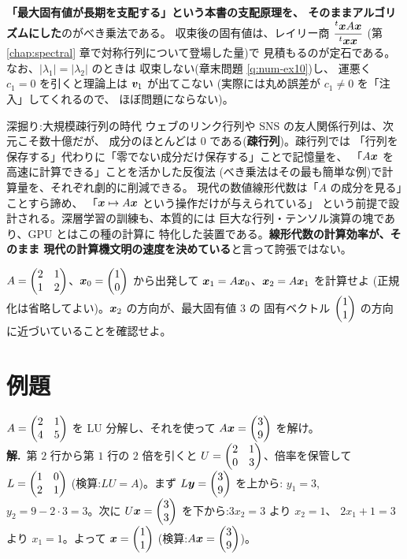 \textbf{「最大固有値が長期を支配する」という本書の支配原理を、
そのままアルゴリズムにした}のがべき乗法である。
収束後の固有値は、レイリー商
$\dfrac{{}^t\bm{x}A\bm{x}}{{}^t\bm{x}\bm{x}}$
(第 \ref{chap:spectral} 章で対称行列について登場した量)で
見積もるのが定石である。なお、$|\lambda_1| = |\lambda_2|$ のときは
収束しない(章末問題 \ref{q:num-ex10})し、
運悪く $c_1 = 0$ を引くと理論上は $\bm{v}_1$ が出てこない
(実際には丸め誤差が $c_1 \neq 0$ を「注入」してくれるので、
ほぼ問題にならない)。

\begin{itembox}[l]{深掘り:大規模疎行列の時代}
ウェブのリンク行列や SNS の友人関係行列は、次元こそ数十億だが、
成分のほとんどは $0$ である(\textbf{疎行列})。疎行列では
「行列を保存する」代わりに「零でない成分だけ保存する」ことで記憶量を、
「$A\bm{x}$ を高速に計算できる」ことを活かした反復法
(べき乗法はその最も簡単な例)で計算量を、それぞれ劇的に削減できる。
現代の数値線形代数は「$A$ の成分を見る」ことすら諦め、
「$\bm{x} \mapsto A\bm{x}$ という操作だけが与えられている」
という前提で設計される。深層学習の訓練も、本質的には
巨大な行列・テンソル演算の塊であり、GPU とはこの種の計算に
特化した装置である。\textbf{線形代数の計算効率が、そのまま
現代の計算機文明の速度を決めている}と言って誇張ではない。
\end{itembox}

\begin{mondai}\label{q:power2}
$A = \begin{pmatrix}2 & 1 \\ 1 & 2\end{pmatrix}$、$\bm{x}_0 = \begin{pmatrix}1 \\ 0\end{pmatrix}$ から出発して
$\bm{x}_1 = A\bm{x}_0$、$\bm{x}_2 = A\bm{x}_1$ を計算せよ
(正規化は省略してよい)。$\bm{x}_2$ の方向が、最大固有値 $3$ の
固有ベクトル $\begin{pmatrix}1 \\ 1\end{pmatrix}$ の方向に近づいていることを確認せよ。
\end{mondai}

\section{例題}

\begin{rei}[例題・基本(LU 分解と二度の代入)]\label{rei:num-basic1}
$A = \begin{pmatrix}2 & 1 \\ 4 & 5\end{pmatrix}$ を LU 分解し、それを使って
$A\bm{x} = \begin{pmatrix}3 \\ 9\end{pmatrix}$ を解け。\\
\textbf{解.}\ 第 $2$ 行から第 $1$ 行の $2$ 倍を引くと
$U = \begin{pmatrix}2 & 1 \\ 0 & 3\end{pmatrix}$、倍率を保管して $L = \begin{pmatrix}1 & 0 \\ 2 & 1\end{pmatrix}$
(検算:$LU = A$)。まず $L\bm{y} = \begin{pmatrix}3 \\ 9\end{pmatrix}$ を上から:
$y_1 = 3$, $y_2 = 9 - 2 \cdot 3 = 3$。次に
$U\bm{x} = \begin{pmatrix}3 \\ 3\end{pmatrix}$ を下から:$3x_2 = 3$ より $x_2 = 1$、
$2x_1 + 1 = 3$ より $x_1 = 1$。よって $\bm{x} = \begin{pmatrix}1 \\ 1\end{pmatrix}$
(検算:$A\bm{x} = \begin{pmatrix}3 \\ 9\end{pmatrix}$)。
\end{rei}

